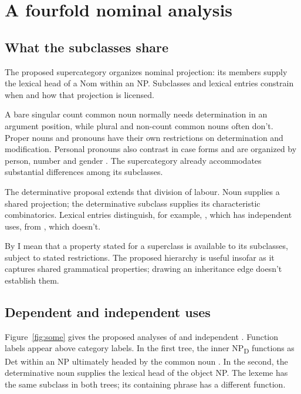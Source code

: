 \documentclass[12pt]{article}
\begin{document}
\section{A fourfold nominal analysis}\label{sec:proposal}

\subsection{What the subclasses share}

The proposed supercategory organizes nominal projection: its members supply the lexical head of a Nom within an NP. Subclasses and lexical entries constrain when and how that projection is licensed.

A bare singular count common noun normally needs determination in an argument position, while plural and non-count common nouns often don't. Proper nouns and pronouns have their own restrictions on determination and modification. Personal pronouns also contrast in case forms and are organized by person, number and gender \citep[425--427]{huddleston2002}. The supercategory already accommodates substantial differences among its subclasses.

The determinative proposal extends that division of labour. Noun supplies a shared projection; the determinative subclass supplies its characteristic combinatorics. Lexical entries distinguish, for example, , which has independent uses, from , which doesn't.

By  I mean that a property stated for a superclass is available to its subclasses, subject to stated restrictions. The proposed hierarchy is useful insofar as it captures shared grammatical properties; drawing an inheritance edge doesn't establish them.

\subsection{Dependent and independent uses}

Figure~\ref{fig:some} gives the proposed analyses of  and independent . Function labels appear above category labels. In the first tree, the inner NP\textsubscript{D} functions as Det within an NP ultimately headed by the common noun . In the second, the determinative noun  supplies the lexical head of the object NP. The lexeme has the same subclass in both trees; its containing phrase has a different function.
\end{document}
